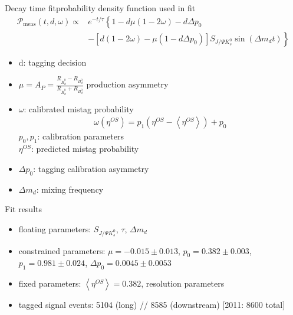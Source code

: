 \documentclass{beamer}
\newcommand{\SJPsi}{S_{J/\Psi K_s^0}}
\begin{document}
	
	\begin{frame}{Decay time fit}{probability density function used in fit}
	\begin{align}
\nonumber\mathcal{P}_{\text{meas}}(t, d, \omega) \propto &e^{-t/\tau} \left\lbrace 1-d\mu(1-2\omega)-d\Delta p_0 \right. \\
&- \left.\left[d(1-2\omega)-\mu(1-d\Delta p_0)\right]\SJPsi\sin(\Delta m_d t)\right\rbrace
	\end{align}	
	\begin{itemize}
		\item d: tagging decision
		\item $\mu = A_P = \frac{R_{\bar{B}_d^0}-R_{B_d^0}}{R_{\bar{B}_d^0}+R_{B_d^0}}$ production asymmetry
		\item $\omega$: calibrated mistag probability
		      \begin{align}
		      \omega(\eta^{OS}) = p_1 (\eta^{OS} - \left\langle \eta^{OS} \right\rangle) + p_0
		      \end{align}
		      $p_0, p_1$: calibration parameters \\
		      $\eta^{OS}$: predicted mistag probability
		\item $\Delta p_0$: tagging calibration asymmetry
		\item $\Delta m_d$: mixing frequency

	\end{itemize}	
	\end{frame}
	
	
	\begin{frame}{Fit results}
	\begin{itemize}
		\item floating parameters: $S_{J/\Psi K_s^0}$, $\tau$, $\Delta m_d$
		\item constrained parameters: $\mu = -0.015\pm0.013$, $p_0 = 0.382\pm0.003$, $p_1=0.981\pm0.024$, $\Delta p_0 = 0.0045\pm0.0053$
		\item fixed parameters: $\left\langle \eta^{OS} \right\rangle = 0.382$, resolution parameters
		\item tagged signal events: 5104 (long) // 8585 (downstream) [2011: 8600 total]
	\end{itemize}
	\end{frame}
\end{document}
